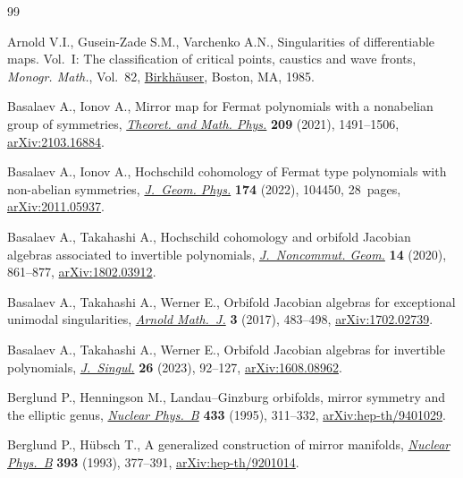 \documentclass[10pt,a4paper]{article}
\numberwithin{equation}{section}
\begin{document}
\begin{thebibliography}{99}
\footnotesize\itemsep=0pt

Arnold V.I., Gusein-Zade S.M., Varchenko A.N., Singularities of differentiable
 maps. {V}ol.~{I}: The classification of critical points, caustics and wave
 fronts, \textit{Monogr. Math.}, Vol.~82, \href{https://doi.org/10.1007/978-1-4612-5154-5}{Birkh\"auser}, Boston, MA, 1985.

Basalaev A., Ionov A., Mirror map for {F}ermat polynomials with a nonabelian
 group of symmetries, \href{https://doi.org/10.1134/S0040577921110015}{\textit{Theoret. and Math. Phys.}} \textbf{209} (2021),
 1491--1506, \href{https://arxiv.org/abs/2103.16884}{arXiv:2103.16884}.

Basalaev A., Ionov A., Hochschild cohomology of {F}ermat type polynomials with
 non-abelian symmetries, \href{https://doi.org/10.1016/j.geomphys.2021.104450}{\textit{J.~Geom. Phys.}} \textbf{174} (2022), 104450,
 28~pages, \href{https://arxiv.org/abs/2011.05937}{arXiv:2011.05937}.

Basalaev A., Takahashi A., Hochschild cohomology and orbifold {J}acobian
 algebras associated to invertible polynomials, \href{https://doi.org/10.4171/jncg/370}{\textit{J.~Noncommut. Geom.}}
 \textbf{14} (2020), 861--877, \href{https://arxiv.org/abs/1802.03912}{arXiv:1802.03912}.

Basalaev A., Takahashi A., Werner E., Orbifold {J}acobian algebras for
 exceptional unimodal singularities, \href{https://doi.org/10.1007/s40598-017-0076-8}{\textit{Arnold Math.~J.}} \textbf{3}
 (2017), 483--498, \href{https://arxiv.org/abs/1702.02739}{arXiv:1702.02739}.

Basalaev A., Takahashi A., Werner E., Orbifold {J}acobian algebras for
 invertible polynomials, \href{https://doi.org/10.5427/jsing.2023.26f}{\textit{J.~Singul.}} \textbf{26} (2023), 92--127,
 \href{https://arxiv.org/abs/1608.08962}{arXiv:1608.08962}.

Berglund P., Henningson M., Landau--{G}inzburg orbifolds, mirror symmetry and
 the elliptic genus, \href{https://doi.org/10.1016/0550-3213(94)00389-V}{\textit{Nuclear Phys.~B}} \textbf{433} (1995), 311--332,
 \href{https://arxiv.org/abs/hep-th/9401029}{arXiv:hep-th/9401029}.

Berglund P., H\"ubsch T., A generalized construction of mirror manifolds,
 \href{https://doi.org/10.1016/0550-3213(93)90250-S}{\textit{Nuclear Phys.~B}} \textbf{393} (1993), 377--391,
 \href{https://arxiv.org/abs/hep-th/9201014}{arXiv:hep-th/9201014}.


\end{thebibliography}
\end{document}
